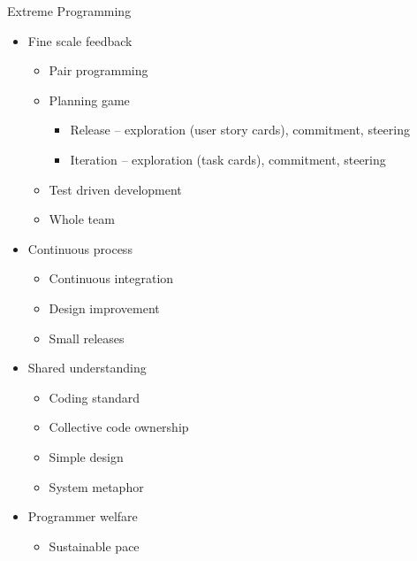 \documentclass{beamer}
\begin{document}
\begin{frame}{Extreme Programming}
\begin{itemize}
\item Fine scale feedback
\begin{itemize}
\item Pair programming
\item Planning game
\begin{itemize}
\item Release -- exploration (user story cards), commitment, steering
\item Iteration -- exploration (task cards), commitment, steering
\end{itemize}
\item Test driven development
\item Whole team
\end{itemize}
\item Continuous process
\begin{itemize}
\item Continuous integration
\item Design improvement
\item Small releases
\end{itemize}
\item Shared understanding
\begin{itemize}
\item Coding standard
\item Collective code ownership
\item Simple design
\item System metaphor
\end{itemize}
\item Programmer welfare
\begin{itemize}
\item Sustainable pace
\end{itemize}
\end{itemize}
\end{frame}
\end{document}
